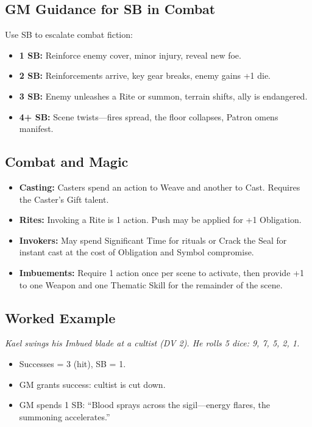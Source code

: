 \subsection{GM Guidance for SB in Combat}
Use SB to escalate combat fiction:
\begin{itemize}
  \item \textbf{1 SB:} Reinforce enemy cover, minor injury, reveal new foe.
  \item \textbf{2 SB:} Reinforcements arrive, key gear breaks, enemy gains +1 die.
  \item \textbf{3 SB:} Enemy unleashes a Rite or summon, terrain shifts, ally is endangered.
  \item \textbf{4+ SB:} Scene twists—fires spread, the floor collapses, Patron omens manifest.
\end{itemize}

\subsection{Combat and Magic}
\begin{itemize}
  \item \textbf{Casting:} Casters spend an action to Weave and another to Cast. Requires the Caster’s Gift talent.
  \item \textbf{Rites:} Invoking a Rite is 1 action. Push may be applied for +1 Obligation.
  \item \textbf{Invokers:} May spend Significant Time for rituals or Crack the Seal for instant cast at the cost of Obligation and Symbol compromise.
  \item \textbf{Imbuements:} Require 1 action once per scene to activate, then provide +1 to one Weapon and one Thematic Skill for the remainder of the scene.
\end{itemize}

\subsection{Worked Example}
\emph{Kael swings his Imbued blade at a cultist (DV 2). He rolls 5 dice: 9, 7, 5, 2, 1.}
\begin{itemize}
  \item Successes = 3 (hit), SB = 1.
  \item GM grants success: cultist is cut down.
  \item GM spends 1 SB: ``Blood sprays across the sigil—energy flares, the summoning accelerates.''
\end{itemize}
